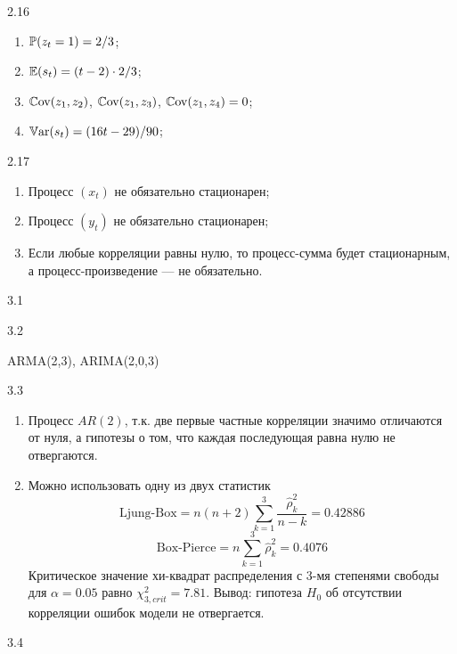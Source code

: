 \protect \hypertarget {soln:2.16}{}
\begin{solution}{{2.16}}
  \begin{enumerate}
  \item $\P(z_t = 1) = 2/3$;
  \item $\E(s_t) = (t-2) \cdot 2/3$;
  \item $\Cov(z_1, z_2)$, $\Cov(z_1, z_3)$, $\Cov(z_1, z_4) = 0$;
  \item $\Var(s_t) = (16t - 29)/90$;
  \end{enumerate}

\end{solution}
\protect \hypertarget {soln:2.17}{}
\begin{solution}{{2.17}}
\begin{enumerate}
  \item Процесс $(x_t)$ не обязательно стационарен;
\item Процесс $(y_t)$ не обязательно стационарен;
\item Если любые корреляции равны нулю, то процесс-сумма будет стационарным, а процесс-произведение — не обязательно.
\end{enumerate}
\end{solution}
\protect \hypertarget {soln:3.1}{}
\begin{solution}{{3.1}}

\end{solution}
\protect \hypertarget {soln:3.2}{}
\begin{solution}{{3.2}}

ARMA(2,3), ARIMA(2,0,3)
\end{solution}
\protect \hypertarget {soln:3.3}{}
\begin{solution}{{3.3}}
\begin{enumerate}
\item Процесс $AR(2)$, т.к. две первые частные корреляции значимо отличаются от нуля, а гипотезы о том, что каждая последующая равна нулю не отвергаются.
\item Можно использовать одну из двух статистик
\[
\text{Ljung-Box}=n(n+2)\sum_{k=1}^3\frac{\hat{\rho}_k^2}{n-k}=
0.42886
\]
\[
\text{Box-Pierce}=n\sum_{k=1}^3\hat{\rho}_k^2=
0.4076
\]
Критическое значение хи-квадрат распределения с 3-мя степенями свободы для $\alpha=0.05$ равно $\chi^2_{3,crit}=7.81$.
Вывод: гипотеза $H_0$ об отсутствии корреляции ошибок модели не отвергается.
\end{enumerate}
\end{solution}
\protect \hypertarget {soln:3.4}{}
\begin{solution}{{3.4}}

\end{solution}
